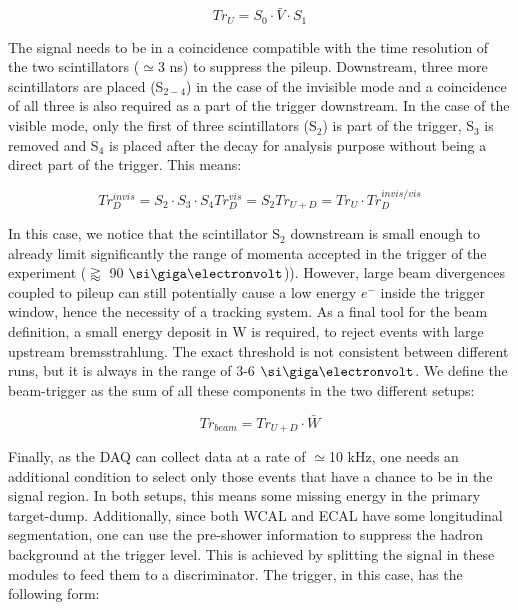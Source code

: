 \begin{equation}
\label{eq:trigger-upstream}
Tr_U = S_0 \cdot \bar{V} \cdot S_1
\end{equation}

The signal needs to be in a coincidence compatible with the time resolution of the two scintillators ($\simeq$3 \si{ns}) to suppress the pileup. Downstream, three more scintillators are placed (S$_{2-4}$) in the case of the invisible mode and a coincidence of all three is also required as a part of the trigger downstream. In the case of the visible mode, only the first of three scintillators (S$_2$) is part of the trigger, S$_3$ is removed and S$_4$ is placed after the decay for analysis purpose without being a direct part of the trigger. This means:

\begin{equation}
\label{eq:trigger-downstream}
Tr^{invis}_D = S_2 \cdot S_3 \cdot S_4
Tr^{vis}_D = S_2
Tr_{U+D} = Tr_U \cdot Tr^{invis/vis}_D
\end{equation}

In this case, we notice that the scintillator S$_2$ downstream is small enough to already limit significantly the range of momenta accepted in the trigger of the experiment ($\gtrapprox$ 90 $\gev$)). However, large beam divergences coupled to pileup can still potentially cause a low energy $e^-$ inside the trigger window, hence the
necessity of a tracking system. As a final tool for the beam definition, a small energy deposit in W is required, to reject events with large upstream bremsstrahlung. The exact threshold is not consistent between different runs, but it is always in the range of 3-6 $\gev$. We define the beam-trigger as the sum of all these components in the two different setups:

\begin{equation}
\label{eq:trigger-beam}
Tr_{beam} = Tr_{U+D} \cdot \bar{W}
\end{equation}

Finally, as the DAQ can collect data at a rate of $\simeq$10 \si{kHz}, one needs an additional condition to select only those events that have a chance to be in the signal region. In both setups, this means some missing energy in the primary target-dump. Additionally, since both WCAL and ECAL have some longitudinal segmentation, one can use the pre-shower information to suppress the hadron background at the trigger level. This is achieved by splitting the signal in these modules to feed them to a discriminator. The trigger, in this case, has the following form:

